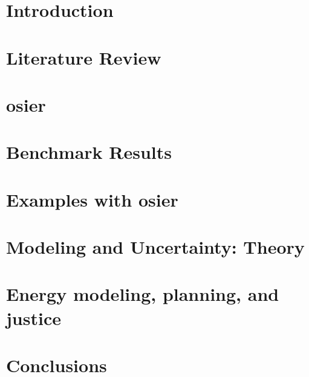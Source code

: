 \chapter{Introduction}
\label{chapter:introduction}
% 

\chapter{Literature Review}
\label{chapter:lit-review}
% 

\chapter{\acf{osier}}
\label{chapter:osier}
% 

\chapter{Benchmark Results}
\label{chapter:benchmark-results}
% 

\chapter{Examples with \acs{osier}}
\label{chapter:examples}
% 

\chapter{Modeling and Uncertainty: Theory}
\label{chapter:modeling-theory}


\chapter{Energy modeling, planning, and justice}
\label{chapter:communities}
% 

\chapter{Conclusions}
\label{chapter:conclusions}